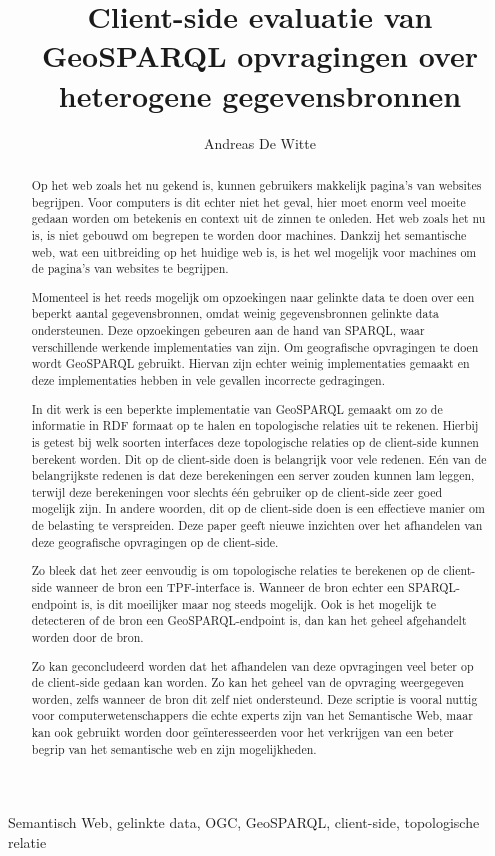 \documentclass[twocolumn]{phdsymp} %
\begin{document}
\title{Client-side evaluatie van GeoSPARQL opvragingen over heterogene gegevensbronnen} %

\author{Andreas De Witte}


\maketitle

\begin{abstract}
    Op het web zoals het nu gekend is, kunnen gebruikers makkelijk pagina's van websites begrijpen. Voor computers is dit echter niet het geval, hier moet enorm veel moeite gedaan worden om betekenis en context uit de zinnen te onleden. Het web zoals het nu is, is niet gebouwd om begrepen te worden door machines. Dankzij het semantische web, wat een uitbreiding op het huidige web is, is het wel mogelijk voor machines om de pagina's van websites te begrijpen.
    
    Momenteel is het reeds mogelijk om opzoekingen naar gelinkte data te doen over een beperkt aantal gegevensbronnen, omdat weinig gegevensbronnen gelinkte data ondersteunen. Deze opzoekingen gebeuren aan de hand van SPARQL, waar verschillende werkende implementaties van zijn. Om geografische opvragingen te doen wordt GeoSPARQL gebruikt. Hiervan zijn echter weinig implementaties gemaakt en deze implementaties hebben in vele gevallen incorrecte gedragingen.
    
    In dit werk is een beperkte implementatie van GeoSPARQL gemaakt om zo de informatie in RDF formaat op te halen en topologische relaties uit te rekenen. Hierbij is getest bij welk soorten interfaces deze topologische relaties op de client-side kunnen berekent worden. Dit op de client-side doen is belangrijk voor vele redenen. Eén van de belangrijkste redenen is dat deze berekeningen een server zouden kunnen lam leggen, terwijl deze berekeningen voor slechts één gebruiker op de client-side zeer goed mogelijk zijn. In andere woorden, dit op de client-side doen is een effectieve manier om de belasting te verspreiden. Deze paper geeft nieuwe inzichten over het afhandelen van deze geografische opvragingen op de client-side.

    Zo bleek dat het zeer eenvoudig is om topologische relaties te berekenen op de client-side wanneer de bron een TPF-interface is. Wanneer de bron echter een SPARQL-endpoint is, is dit moeilijker maar nog steeds mogelijk. Ook is het mogelijk te detecteren of de bron een GeoSPARQL-endpoint is, dan kan het geheel afgehandelt worden door de bron.
    
    Zo kan geconcludeerd worden dat het afhandelen van deze opvragingen veel beter op de client-side gedaan kan worden. Zo kan het geheel van de opvraging weergegeven worden, zelfs wanneer de bron dit zelf niet ondersteund. Deze scriptie is vooral nuttig voor computerwetenschappers die echte experts zijn van het Semantische Web, maar kan ook gebruikt worden door geïnteresseerden voor het verkrijgen van een beter begrip van het semantische web en zijn mogelijkheden.
\end{abstract}

\begin{keywords}
    Semantisch Web, gelinkte data, OGC, GeoSPARQL, client-side, topologische relatie
\end{keywords}
\end{document}
